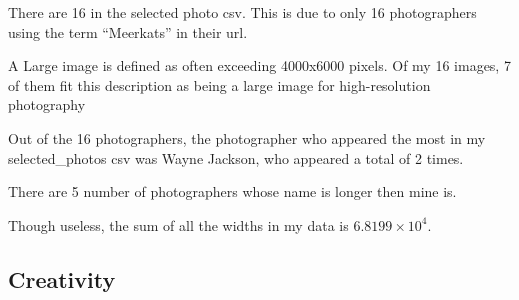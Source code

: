 \documentclass[
]{article}
\newenvironment{Shaded}{\begin{snugshade}}{\end{snugshade}}
\newcommand{\AttributeTok}[1]{\textcolor[rgb]{0.13,0.29,0.53}{#1}}
\newcommand{\ConstantTok}[1]{\textcolor[rgb]{0.56,0.35,0.01}{#1}}
\newcommand{\DecValTok}[1]{\textcolor[rgb]{0.00,0.00,0.81}{#1}}
\newcommand{\FunctionTok}[1]{\textcolor[rgb]{0.13,0.29,0.53}{\textbf{#1}}}
\newcommand{\NormalTok}[1]{#1}
\newcommand{\OtherTok}[1]{\textcolor[rgb]{0.56,0.35,0.01}{#1}}
\newcommand{\SpecialCharTok}[1]{\textcolor[rgb]{0.81,0.36,0.00}{\textbf{#1}}}
\newcommand{\StringTok}[1]{\textcolor[rgb]{0.31,0.60,0.02}{#1}}
\begin{document}
\begin{Shaded}
\end{Shaded}

There are 16 in the selected photo csv. This is due to only 16
photographers using the term ``Meerkats'' in their url.

A Large image is defined as often exceeding 4000x6000 pixels. Of my 16
images, 7 of them fit this description as being a large image for
high-resolution photography

Out of the 16 photographers, the photographer who appeared the most in
my selected\_photos csv was Wayne Jackson, who appeared a total of 2
times.

There are 5 number of photographers whose name is longer then mine is.

Though useless, the sum of all the widths in my data is
\ensuremath{6.8199\times 10^{4}}.

\subsection{Creativity}\label{creativity}
\end{document}
